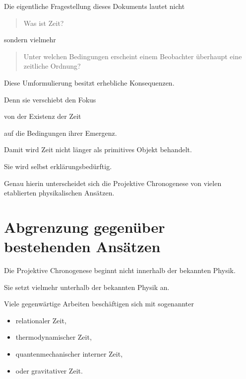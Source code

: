 \documentclass[11pt,a4paper]{article}
\begin{document}
Die eigentliche Fragestellung dieses Dokuments lautet nicht

\begin{quote}

Was ist Zeit?

\end{quote}

sondern vielmehr

\begin{quote}

Unter welchen Bedingungen erscheint einem
Beobachter überhaupt eine zeitliche Ordnung?

\end{quote}

Diese Umformulierung besitzt erhebliche Konsequenzen.

Denn sie verschiebt den Fokus

von der Existenz der Zeit

auf die Bedingungen ihrer Emergenz.

Damit wird Zeit nicht länger als primitives Objekt
behandelt.

Sie wird selbst erklärungsbedürftig.

Genau hierin unterscheidet sich die Projektive
Chronogenese von vielen etablierten physikalischen
Ansätzen.

\section{Abgrenzung gegenüber bestehenden Ansätzen}

Die Projektive Chronogenese beginnt nicht innerhalb der
bekannten Physik.

Sie setzt vielmehr unterhalb der bekannten Physik an.

Viele gegenwärtige Arbeiten beschäftigen sich mit
sogenannter

\begin{itemize}

\item relationaler Zeit,

\item thermodynamischer Zeit,

\item quantenmechanischer interner Zeit,

\item oder gravitativer Zeit.

\end{itemize}
\end{document}
